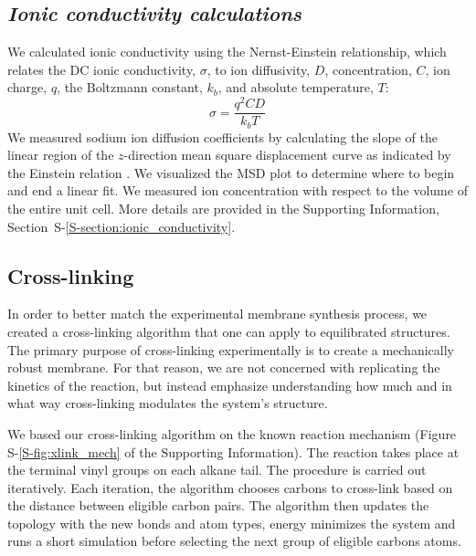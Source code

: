 \documentclass[journal=jpcbfk,manuscript=article]{achemso}
\begin{document}
  \subsection{\textit{Ionic conductivity calculations}}

  We calculated ionic conductivity using the Nernst-Einstein relationship, which 
  relates the DC ionic conductivity, $\sigma$, to ion diffusivity, $D$, 
  concentration, $C$, ion charge, $q$, the Boltzmann constant, $k_b$, and 
  absolute temperature, $T$: 
  \begin{equation}
	\sigma = \dfrac{q^2CD}{k_b T} 
	\label{eqn:nernst_einstein}
  \end{equation}
  We measured sodium ion diffusion coefficients by calculating the slope
  of the linear region of the $z$-direction mean square displacement curve as
  indicated by the Einstein relation \cite{einstein_investigations_1956}. We
  visualized the MSD plot to determine where to begin and end a linear fit. We
  measured ion concentration with respect to the volume of the entire unit cell. 
  More details are provided in the Supporting Information, Section~S-\ref{S-section:ionic_conductivity}.

  \subsection{Cross-linking}
  
  In order to better match the experimental membrane synthesis process,
  we created a cross-linking algorithm that one can apply to equilibrated structures. 
  The primary purpose of cross-linking experimentally is to create a mechanically robust membrane.
  For that reason, we are not concerned with replicating the kinetics of the reaction, 
  but instead emphasize understanding how much and in what way cross-linking modulates
  the system's structure.

  We based our cross-linking algorithm on the known reaction mechanism 
  (Figure S-\ref{S-fig:xlink_mech} of the Supporting Information). The reaction 
  takes place at the terminal vinyl groups
  on each alkane tail. The procedure is carried out iteratively. Each iteration, the
  algorithm chooses carbons to cross-link based on the distance between eligible 
  carbon pairs. The algorithm then updates the topology with the new bonds and atom
  types, energy minimizes the system and runs a short simulation before selecting 
  the next group of eligible carbons atoms.
  
\end{document}
